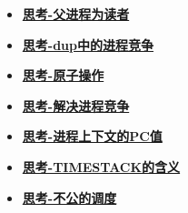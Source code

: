 \begin{itemize}
	\item \hyperref[think-father-reader]{\textbf{\textcolor{baseB}{思考-父进程为读者}}}
	\item \hyperref[think-dup]{\textbf{\textcolor{baseB}{思考-dup中的进程竞争}}}
	\item \hyperref[think-automatic]{\textbf{\textcolor{baseB}{思考-原子操作}}}
	\item \hyperref[think-race]{\textbf{\textcolor{baseB}{思考-解决进程竞争}}}
	\item \hyperref[think-pc]{\textbf{\textcolor{baseB}{思考-进程上下文的PC值}}}
	\item \hyperref[think-TIMESTACK]{\textbf{\textcolor{baseB}{思考-TIMESTACK的含义}}}
	\item \hyperref[think-调度]{\textbf{\textcolor{baseB}{思考-不公的调度}}}
\end{itemize}





